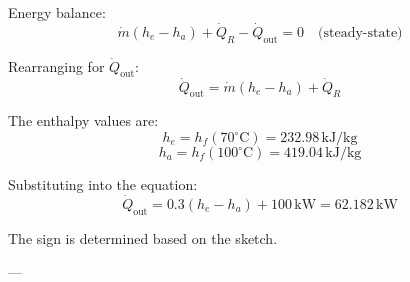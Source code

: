 Energy balance:  
\[
\dot{m}(h_e - h_a) + \dot{Q}_R - \dot{Q}_{\text{out}} = 0 \quad \text{(steady-state)}
\]  

Rearranging for \(\dot{Q}_{\text{out}}\):  
\[
\dot{Q}_{\text{out}} = \dot{m}(h_e - h_a) + \dot{Q}_R
\]  

The enthalpy values are:  
\[
h_e = h_f(70^\circ\text{C}) = 232.98 \, \text{kJ/kg}
\]  
\[
h_a = h_f(100^\circ\text{C}) = 419.04 \, \text{kJ/kg}
\]  

Substituting into the equation:  
\[
\dot{Q}_{\text{out}} = 0.3 \left(h_e - h_a\right) + 100 \, \text{kW} = 62.182 \, \text{kW}
\]  

The sign is determined based on the sketch.  

---